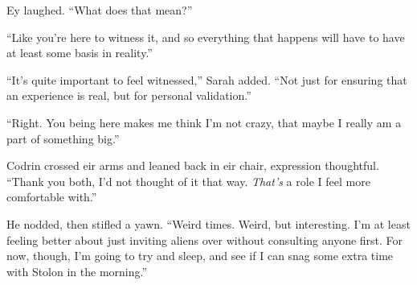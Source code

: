 Ey laughed. ``What does that mean?''

``Like you're here to witness it, and so everything that happens will have to have at least some basis in reality.''

``It's quite important to feel witnessed,'' Sarah added. ``Not just for ensuring that an experience is real, but for personal validation.''

``Right. You being here makes me think I'm not crazy, that maybe I really am a part of something big.''

Codrin crossed eir arms and leaned back in eir chair, expression thoughtful. ``Thank you both, I'd not thought of it that way. \emph{That's} a role I feel more comfortable with.''

He nodded, then stifled a yawn. ``Weird times. Weird, but interesting. I'm at least feeling better about just inviting aliens over without consulting anyone first. For now, though, I'm going to try and sleep, and see if I can snag some extra time with Stolon in the morning.''
